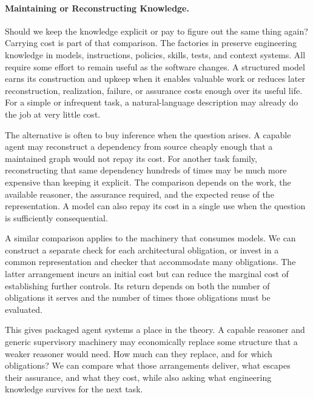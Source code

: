 \paragraph{Maintaining or Reconstructing Knowledge.}


Should we keep the knowledge explicit or pay to figure out the same thing again? Carrying cost is part of that comparison. The factories in  preserve engineering knowledge in models, instructions, policies, skills, tests, and context systems. All require some effort to remain useful as the software changes. A structured model earns its construction and upkeep when it enables valuable work or reduces later reconstruction, realization, failure, or assurance costs enough over its useful life. For a simple or infrequent task, a natural-language description may already do the job at very little cost.

The alternative is often to buy inference when the question arises. A capable agent may reconstruct a dependency from source cheaply enough that a maintained graph would not repay its cost. For another task family, reconstructing that same dependency hundreds of times may be much more expensive than keeping it explicit. The comparison depends on the work, the available reasoner, the assurance required, and the expected reuse of the representation. A model can also repay its cost in a single use when the question is sufficiently consequential.

A similar comparison applies to the machinery that consumes models. We can construct a separate check for each architectural obligation, or invest in a common representation and checker that accommodate many obligations. The latter arrangement incurs an initial cost but can reduce the marginal cost of establishing further controls. Its return depends on both the number of obligations it serves and the number of times those obligations must be evaluated.


This gives packaged agent systems a place in the theory. A capable reasoner and generic supervisory machinery may economically replace some structure that a weaker reasoner would need. How much can they replace, and for which obligations? We can compare what those arrangements deliver, what escapes their assurance, and what they cost, while also asking what engineering knowledge survives for the next task.

